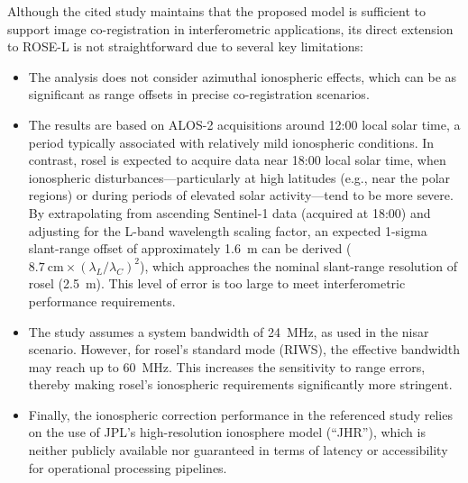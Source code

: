 Although the cited study maintains that the proposed model is sufficient to support image co-registration in interferometric applications, its direct extension to ROSE-L is not straightforward due to several key limitations:

\begin{itemize}
    \item The analysis does not consider azimuthal ionospheric effects, which can be as significant as range offsets in precise co-registration scenarios.
    
    \item The results are based on ALOS-2 acquisitions around 12:00 local solar time, a period typically associated with relatively mild ionospheric conditions. In contrast, \acs{rosel} is expected to acquire data near 18:00 local solar time, when ionospheric disturbances—particularly  at high latitudes (e.g., near the polar regions) or during periods of elevated solar activity—tend to be more severe. By extrapolating from ascending Sentinel-1 data (acquired at 18:00) and adjusting for the L-band wavelength scaling factor, an expected 1-sigma slant-range offset of approximately 1.6~m can be derived ($8.7~\text{cm} \times (\lambda_L/\lambda_C)^2$), which approaches the nominal slant-range resolution of \acs{rosel} (2.5~m). This level of error is too large to meet interferometric performance requirements.
    
    \item The study assumes a system bandwidth of 24~MHz, as used in the \acs{nisar} scenario. However, for \acs{rosel}'s standard mode (RIWS), the effective bandwidth may reach up to 60~MHz. This increases the sensitivity to range errors, thereby making \acs{rosel}’s ionospheric requirements significantly more stringent.
    
    \item Finally, the ionospheric correction performance in the referenced study relies on the use of JPL’s high-resolution ionosphere model (“JHR”), which is neither publicly available nor guaranteed in terms of latency or accessibility for operational processing pipelines.
\end{itemize}


